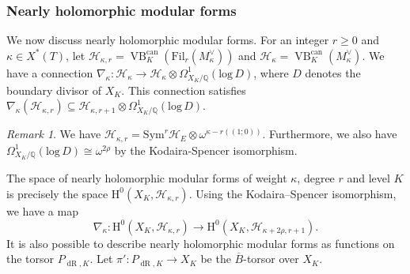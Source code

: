 \documentclass[10pt, oneside]{amsart}
\numberwithin{equation}{subsection}
\theoremstyle{definition}
\theoremstyle{remark}
\newtheorem{remark}[equation]{Remark}
\newcommand{\opn}[1]{\operatorname{#1}}
\def\Q{\mathbb{Q}}
\begin{document}
\subsubsection{Nearly holomorphic modular forms}

We now discuss nearly holomorphic modular forms. For an integer $r \geq 0$ and $\kappa \in X^*(T)$, let $\mathcal{H}_{\kappa,r} = \opn{VB}^{\opn{can}}_{K} ( \mathrm{Fil}_r(M_{\kappa}^\vee))$ and $\mathcal{H}_{\kappa} = \opn{VB}^{\opn{can}}_K(M_{\kappa}^\vee)$. We have a connection $\nabla_\kappa : \mathcal{H}_{\kappa} \rightarrow \mathcal{H}_{\kappa} \otimes \Omega^1_{X_K/\Q}(\mathrm{log}\,D)$, where $D$ denotes the boundary divisor of $X_K$. This connection satisfies $\nabla_\kappa ( \mathcal{H}_{\kappa, r} ) \subseteq  \mathcal{H}_{\kappa, r+1} \otimes \Omega^1_{X_K/\Q}(\mathrm{log}\,D)$. 


\begin{remark} 
We have $\mathcal{H}_{\kappa,r} = \mathrm{Sym}^r \mathcal{H}_{E} \otimes \omega^{\kappa-r((1;0))}$. Furthermore, we also have $\Omega^1_{X_K/\Q}(\mathrm{log}\,D) \cong \omega^{2\rho}$ by the Kodaira-Spencer isomorphism. 
\end{remark}

The space of nearly holomorphic modular forms of weight $\kappa$, degree $r$ and level $K$ is precisely the space $\mathrm{H}^0(X_K, \mathcal{H}_{\kappa,r})$. Using the Kodaira--Spencer isomorphism, we have a map 
\[
\nabla_\kappa : \mathrm{H}^0(X_K, \mathcal{H}_{\kappa,r}) \rightarrow \mathrm{H}^0(X_K, \mathcal{H}_{\kappa + 2\rho,r+1}).
\]
It is also possible to describe nearly holomorphic modular forms as functions on the torsor $P_{\opn{dR},K}$. Let $\pi' : P_{\opn{dR},K} \rightarrow X_{K}$ be the $\overline{B}$-torsor over $X_K$. 
\end{document}
